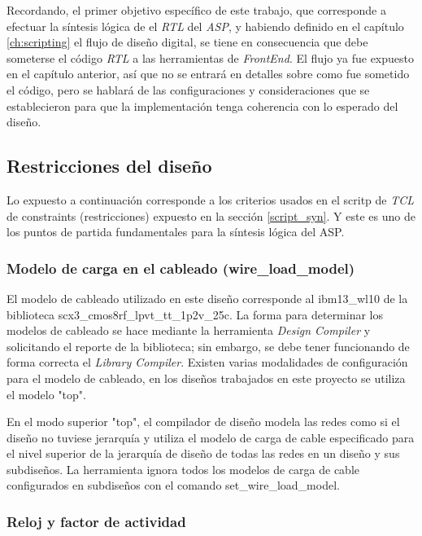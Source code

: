 Recordando, el primer objetivo específico de este trabajo, que corresponde a efectuar la síntesis lógica de el \textit{RTL} del \textit{ASP}, y habiendo definido en el capítulo \ref{ch:scripting} el flujo de diseño digital, se tiene en consecuencia que debe someterse el código \textit{RTL} a las herramientas de \textit{FrontEnd}. El flujo ya fue expuesto en el capítulo anterior, así que no se entrará en detalles sobre como fue sometido el código, pero se hablará de las configuraciones y consideraciones que se establecieron para que la implementación tenga coherencia con lo esperado del diseño.

\subsection{Restricciones del diseño}
\label{s_sec:const}

Lo expuesto a continuación corresponde a los criterios usados en el scritp de \textit{TCL} de constraints (restricciones) expuesto en la sección \ref{script_syn}. Y este es uno de los puntos de partida fundamentales para la síntesis lógica del ASP.

\subsubsection{Modelo de carga en el cableado (wire\_load\_model)}
El modelo de cableado utilizado en este diseño corresponde al ibm13\_wl10 de la biblioteca scx3\_cmos8rf\_lpvt\_tt\_1p2v\_25c. La forma para determinar los modelos de cableado se hace mediante la herramienta \textit{Design Compiler} y solicitando el reporte de la biblioteca; sin embargo, se debe tener funcionando de forma correcta el \textit{Library Compiler}. Existen varias modalidades de configuración para el modelo de cableado, en los diseños trabajados en este proyecto se utiliza el modelo "top".

En el modo superior "top", el compilador de diseño modela las redes como si el diseño no tuviese jerarquía y utiliza el modelo de carga de cable especificado para el nivel superior de la jerarquía de diseño de todas las redes en un diseño y sus subdiseños. La herramienta ignora todos los modelos de carga de cable configurados en subdiseños con el comando set\_wire\_load\_model.

\subsubsection{Reloj y factor de actividad}


